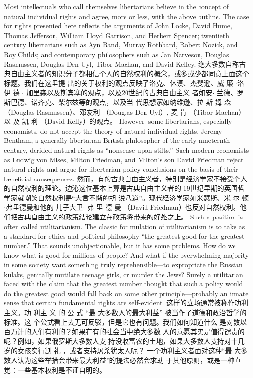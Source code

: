 \begin{paracol}{2}
Most intellectuals who call themselves libertarians believe in
the concept of natural individual rights and agree, more or less,
with the above outline. The case for rights presented here reflects the arguments of John Locke, David Hume, Thomas Jefferson, William Lloyd Garrison, and Herbert Spencer;
twentieth century libertarians such as Ayn Rand, Murray Rothbard, Robert Nozick, and Roy Childs; and contemporary
philosophers such as Jan Narveson, Douglas Rasmussen, Douglas Den Uyl, Tibor Machan, and David Kelley.
\switchcolumn
绝大多数自称古典自由主义者的知识分子都相信个人的自然权利的概念，或多或少都同意上面这个标题。我们在这里提
出的关于权利的观点反映了洛克、休谟、杰斐逊、威 廉 $\cdot$洛伊
德 $\cdot$ 加里森以及斯宾塞的观点，以及20世纪的古典自由主义
者如安$\cdot$ 兰德、罗斯巴德、诺齐克、柴尔兹等的观点，以及当
代思想家如纳维逊、拉 斯 姆 森 （Douglas  Rasmussen）、邓友利
（Douglas Den Uyl）, 麦 肯 （Tibor  Machan） 以 及 凯 利 （David
Kelly）的观点。
\switchcolumn*
However, some libertarians, especially economists, do not accept the theory of natural individual rights. Jeremy Bentham, a
generally libertarian British philosopher of the early nineteenth
century, derided natural rights as ``nonsense upon stilts.'' Such
modern economists as Ludwig von Mises, Milton Friedman,
and Milton's son David Friedman reject natural rights and
argue for libertarian policy conclusions on the basis of their beneficial consequences.
\switchcolumn
然而，有的古典自由主义者，特别是经济学家不接受个人
的自然权利的理论。边沁这位基本上算是古典自由主义者的
19世纪早期的英国哲学家就嘲笑自然权利是“大言不惭的胡
说八道”。现代经济学家如米瑟斯、米 尔 顿 $\cdot$弗里德曼和他的
儿子大卫$\cdot$ 弗 里 德 曼 （David  Friedman）也反对自然权利。他
们把古典自由主义的政策结论建立在政策将带来的好处之上。
\switchcolumn*
Such a position is often called utilitarianism. The classic for mulation of utilitarianism is to take as a standard for ethics and
political philosophy ``the greatest good for the greatest number.'' That sounds unobjectionable, but it has some problems.
How do we know what is good for millions of people? And
what if the overwhelming majority in some society want something truly reprehensible---to expropriate the Russian kulaks,
genitally mutilate teenage girls, or murder the Jews? Surely a
utilitarian faced with the claim that the greatest number
thought that such a policy would do the greatest good would
fall back on some other principle---probably an innate sense
that certain fundamental rights are self-evident.
\switchcolumn
这样的立场通常被称作功利主义。功 利主 义 的 公 式 “最
大多数人的最大利益” 被当作了道德和政治哲学的标准。这
个公式看上去无可反驳，但是它也有问题。我们如何知道什么
是对数以百万计的人们有利的？如果在有的社会当中绝大多数
人的意愿其实是值得谴责的呢？例如，如果俄罗斯大多数人支
持没收富农的土地，如果大多数人支持对十几岁的女孩实行割
礼 ，或者支持屠杀犹太人呢？ 一个功利主义者面对这种“最
大多数人认为这些举措会带来最大利益”的提法必然会求助
于其他原则，或是一种直觉：一些基本权利是不证自明的。


\end{paracol}
